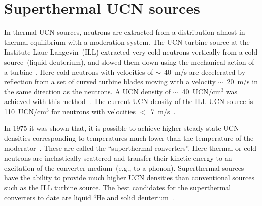 \section{Superthermal UCN sources}
\label{sec:ucn_with_heII}



In thermal UCN sources, neutrons are extracted from a distribution
almost in thermal equilibrium with a moderation system. The UCN
turbine source at the Institute Laue-Langevin~(ILL) extracted very
cold neutrons vertically from a cold source~(liquid deuterium), and
slowed them down using the mechanical action of a
turbine~\cite{Steyerl1986,Steyerl1975}. Here cold neutrons with
velocities of $\sim$~40~m/s are decelerated by reflection from a set
of curved turbine blades moving with a velocity $\sim$~20~m/s in the
same direction as the neutrons. A UCN density of $\sim$~40~UCN/cm$^3$
was achieved with this method~\cite{ucnbook,Albert_talk}. The current
UCN density of the ILL UCN source is 110~UCN/cm$^3$ for neutrons with
velocities $<$~7~m/s~\cite{Steyerl1986}.


In 1975 it was shown that, it is possible to achieve higher steady
state UCN densities corresponding to temperatures much lower than the
temperature of the moderator~\cite{Golub75}. These are called the
``superthermal converters''. Here thermal or cold neutrons are
inelastically scattered and transfer their kinetic energy to an
excitation of the converter medium~(e.g., to a phonon).  Superthermal
sources have the ability to provide much higher UCN densities than
conventional sources such as the ILL turbine source. The best
candidates for the superthermal converters to date are liquid $^4$He
and solid deuterium~\cite{ucnbook}.




